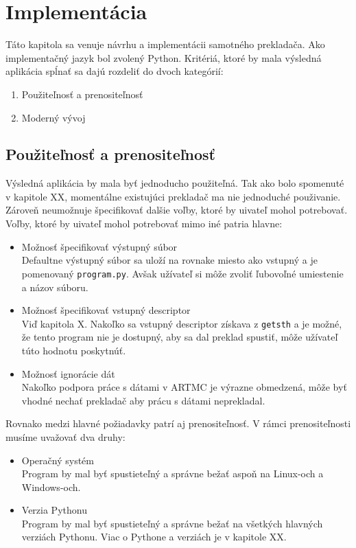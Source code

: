 \chapter{Implementácia}
Táto kapitola sa venuje návrhu a implementácii samotného prekladača.
Ako implementačný jazyk bol zvolený Python. Kritériá, ktoré by mala výsledná
aplikácia spĺnať sa dajú rozdeliť do dvoch kategórií:
\begin{enumerate}
    \item Použiteľnosť a prenositeľnosť
    \item Moderný vývoj
\end{enumerate}

\section{Použiteľnosť a prenositeľnosť}
Výsledná aplikácia by mala byť jednoducho použiteľná. Tak ako bolo spomenuté v
kapitole XX, momentálne existujúci prekladač ma nie jednoduché použivanie. Zároveň
neumožnuje špecifikovať dalšie voľby, ktoré by uivateľ mohol potrebovať. Voľby,
ktoré by uivateľ mohol potrebovať mimo iné patria hlavne:
\begin{itemize}
    \item Možnosť špecifikovať výstupný súbor\\
        Defaultne výstupný súbor sa uloží na rovnake miesto ako vstupný a je
        pomenovaný \texttt{program.py}. Avšak užívateľ si môže zvoliť ľubovoľné umiestenie
        a názov súboru.
    \item Možnosť špecifikovať vstupný descriptor\\
        Viď kapitola X. Nakoľko sa vstupný descriptor získava z \texttt{getsth} a je
        možné, že tento program nie je dostupný, aby sa dal preklad spustiť, môže
        užívateľ túto hodnotu poskytnúť.
    \item Možnosť ignorácie dát\\
        Nakoľko podpora práce s dátami v ARTMC je výrazne obmedzená, môže byť
        vhodné nechať prekladač aby prácu s dátami neprekladal.
\end{itemize}

Rovnako medzi hlavné požiadavky patrí aj prenositeľnosť. V rámci prenositeľnosti
musíme uvažovať dva druhy:
\begin{itemize}
    \item Operačný systém\\
        Program by mal byť spustieteľný a správne bežať aspoň na Linux-och a Windows-och.
    \item Verzia Pythonu\\
        Program by mal byť spustieteľný a správne bežať na všetkých hlavných verziách Pythonu.
        Viac o Pythone a verziách je v kapitole XX.
\end{itemize}

